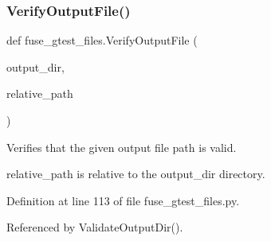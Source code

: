 \subsubsection{\texorpdfstring{Verify\+Output\+File()}{VerifyOutputFile()}}
{\footnotesize\ttfamily def fuse\+\_\+gtest\+\_\+files.\+Verify\+Output\+File (\begin{DoxyParamCaption}\item[{}]{output\+\_\+dir,  }\item[{}]{relative\+\_\+path }\end{DoxyParamCaption})}

\begin{DoxyVerb}Verifies that the given output file path is valid.

relative_path is relative to the output_dir directory.
\end{DoxyVerb}
 

Definition at line 113 of file fuse\+\_\+gtest\+\_\+files.\+py.



Referenced by Validate\+Output\+Dir().


